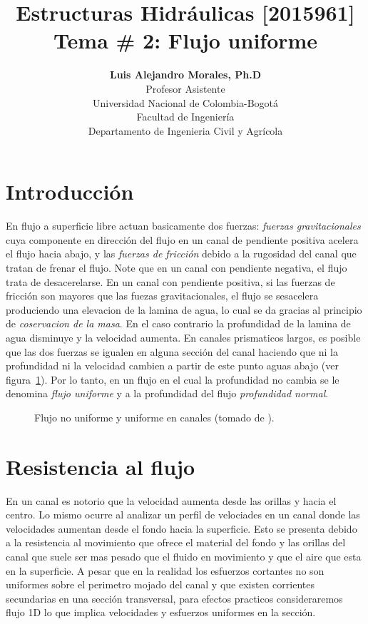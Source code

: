 \documentclass[11pt, oneside]{article}
\title{Estructuras Hidr\'aulicas [2015961] \\ \textbf{Tema \# 2: Flujo uniforme}}
\author{\textbf{Luis Alejandro Morales, Ph.D}\\ \vspace{0.4cm} Profesor Asistente \\ Universidad Nacional de Colombia-Bogot\'a\\Facultad de Ingenier\'ia \\ Departamento de Ingenieria Civil y Agr\'icola}
\date{}
\begin{document}
\maketitle
\tableofcontents


\section{Introducci\'on} %
En flujo a superficie libre actuan basicamente dos fuerzas: \emph{fuerzas gravitacionales} cuya componente en direcci\'on del flujo en un canal de pendiente positiva acelera el flujo hacia abajo, y las \emph{fuerzas de fricci\'on} debido a la rugosidad del canal que tratan de frenar el flujo. Note que en un canal con pendiente negativa, el flujo trata de desacerelarse. En un canal con pendiente positiva, si las fuerzas de fricci\'on son mayores que las fuezas gravitacionales, el flujo se sesacelera produciendo una elevacion de la lamina de agua, lo cual se da gracias al principio de \emph{coservacion de la masa}. En el caso contrario la profundidad de la lamina de agua disminuye y la velocidad aumenta. En canales prismaticos largos, es posible que las dos fuerzas se igualen en alguna secci\'on del canal haciendo que ni la profundidad ni la velocidad cambien a partir de este punto aguas abajo (ver figura~\ref{fig1}). Por lo tanto, en un flujo en el cual la profundidad no cambia se le denomina \emph{flujo uniforme} y a la profundidad del flujo \emph{profundidad normal}.

\begin{figure}[h]
\centering
\caption{Flujo no uniforme y uniforme en canales (tomado de \cite{Chau}).}
\label{fig1}
\end{figure}


\section{Resistencia al flujo} %
En un canal es notorio que la velocidad aumenta desde las orillas y hacia el centro. Lo mismo ocurre al analizar un perfil de velociades en un canal donde las velocidades aumentan desde el fondo hacia la superficie. Esto se presenta debido a la resistencia al movimiento que ofrece el material del fondo y las orillas del canal que suele ser mas pesado que el fluido en movimiento y que el aire que esta en la superficie. A pesar que en la realidad los esfuerzos cortantes no son uniformes sobre el perimetro mojado del canal y que existen corrientes secundarias en una secci\'on transversal, para efectos practicos consideraremos flujo 1D lo que implica velocidades y esfuerzos uniformes en la secci\'on. 
\end{document}

